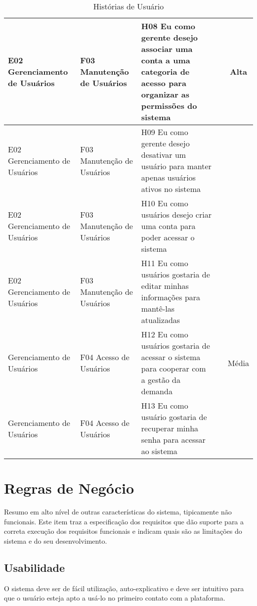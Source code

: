 \begin{table}[H]
	\begin{turn}{90}
		\begin{tabular}{|>{\centering}p{4cm}|>{\centering}p{4cm}|>{\centering}p{6cm}|>{\centering}p{6cm}|c|}
			\hline 
			E02 Gerenciamento de Usuários & F03 Manutenção de Usuários & H08 Eu como gerente desejo associar uma conta a uma categoria de acesso
			para organizar as permissões do sistema &  & Alta\tabularnewline
			\hline 
			E02 Gerenciamento de Usuários & F03 Manutenção de Usuários & H09 Eu como gerente desejo desativar um usuário para manter apenas usuários
			ativos no sistema &  & \tabularnewline
			\hline 
			E02 Gerenciamento de Usuários & F03 Manutenção de Usuários & H10 Eu como usuários desejo criar uma conta para poder acessar o sistema &  & \tabularnewline
			\hline 
			E02 Gerenciamento de Usuários & F03 Manutenção de Usuários & H11 Eu como usuários gostaria de editar minhas informações para mantê-las
			atualizadas &  & \tabularnewline
			\hline 
			Gerenciamento de Usuários & F04 Acesso de Usuários & H12 Eu como usuários gostaria de acessar o sistema para cooperar com a
			gestão da demanda &  & Média\tabularnewline
			\hline 
			Gerenciamento de Usuários & F04 Acesso de Usuários & H13 Eu como usuário gostaria de recuperar minha senha para acessar ao
			sistema &  & \tabularnewline
			\hline 
		\end{tabular}
	\end{turn}
	\caption{Histórias de Usuário}
	\label{Historias2}
\end{table}

\section{Regras de Negócio}

Resumo em alto nível de outras características do sistema, tipicamente não funcionais.
Este item traz a especificação dos requisitos que dão suporte para a correta execução dos requisitos funcionais e indicam quais são as limitações do sistema e do seu desenvolvimento.

\subsection{Usabilidade}

O sistema deve ser de fácil utilização, auto-explicativo e deve  ser intuitivo para que o usuário esteja apto a usá-lo no primeiro contato com a plataforma.

